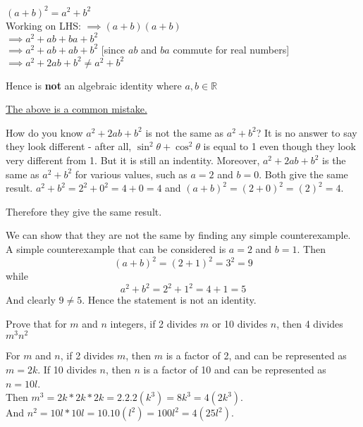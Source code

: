 \documentclass[addpoints]{exam}
\newenvironment{problem}[2][Problem]{\begin{trivlist}
    \item[\hskip \labelsep {\bfseries #1}\hskip \labelsep {\bfseries #2.}]}{\end{trivlist}}
\begin{document}
\begin{sloppypar}
\begin{questions}
\begin{solution}
            $ (a + b)^2 = a^2 + b^2 $ \\ Working on LHS: 
            $ \implies (a + b)(a + b) $ \\ $ \implies a^2 + ab + ba + b^2 $ \\ $ \implies a^2 + ab + ab + b^2 $ [since $ab$  and $ba$ commute for real numbers] \\ $ \implies a^2 + 2ab + b^2 \neq a^2 + b^2 $

            Hence is \textbf{not} an algebraic identity where $ a, b \in \mathbb{R} $

            \underline{The above is a common mistake.} 
            
            How do you know $ a^2 + 2ab + b^2 $ is not the same as $ a^2 + b^2 $? It is no answer to say they look different - after all, $ \sin^2\theta + \cos^2\theta $ is equal to 1 even though they look very different from 1. But it is still an indentity. Moreover, $ a^2 + 2ab + b^2 $ is the same as $ a^2 + b^2 $ for various values, such as $ a = 2 $ and $ b = 0 $. Both give the same result. $ a^2 + b^2 = 2^2 + 0^2 = 4 + 0 = 4 $ and $ (a+b)^2 = (2 + 0)^2 = (2)^2 = 4 $. 

            Therefore they give the same result. 

            \vspace*{5mm}
            We can show that they are not the same by finding any simple counterexample. A simple counterexample that can be considered is $ a = 2 $ and $ b = 1 $. Then $$ (a + b)^2 = (2 + 1)^2 = 3^2 = 9$$ while $$a^2 + b^2 = 2^2 + 1^2 = 4 + 1 = 5 $$
            And clearly $ 9 \neq 5 $. Hence the statement is not an identity.
        \end{solution}
    \end{questions}

    \begin{problem}{6}
    Prove that for $m$ and $n$ integers, if 2 divides $m$ or 10 divides $n$, then 4 divides $m^{3}n^{2}$
    \end{problem}

    \begin{questions}
        \question
        \begin{solution}
            
            For $m$ and $n$, if 2 divides $m$, then $m$ is a factor of 2, and can be represented as $ m = 2k $. If 10 divides $n$, then $n$ is a factor of 10 and can be represented as $ n = 10l $. \\ 
            Then $m^3 = 2k * 2k * 2k = 2.2.2(k^3) = 8k^3 = 4(2k^3)$. \\ 
            And $ n^2 = 10l * 10l = 10.10(l^2) = 100l^2 = 4(25l^2) $.


\end{solution}
\end{questions}
\end{sloppypar}
\end{document}
